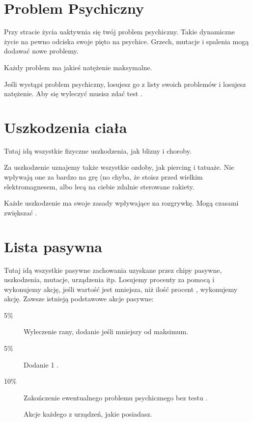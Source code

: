 \section{Problem Psychiczny}
Przy stracie życia uaktywnia się twój problem psychiczny.
Takie dynamiczne życie na pewno odciska swoje pięto na psychice. 
Grzech, mutacje i spalenia mogą dodawać nowe problemy.

Każdy problem ma jakieś natężenie maksymalne.

Jeśli wystąpi problem psychiczny, losujesz go z listy swoich problemów i losujesz natężenie.
Aby się wyleczyć musisz zdać test \abh{}.

\section{Uszkodzenia ciała}
Tutaj idą wszystkie fizyczne uszkodzenia, jak blizny i choroby.

Za uszkodzenie uznajemy także wszystkie ozdoby, jak piercing i tatuaże.
Nie wpływają one za bardzo na grę (no chyba, że stoisz przed wielkim elektromagnesem, albo lecą na ciebie zdalnie sterowane rakiety.

Każde uszkodzenie ma swoje zasady wpływające na rozgrywkę.
Mogą czasami zwiększać \abnkp{}.

\section{Lista pasywna}
Tutaj idą wszystkie pasywne zachowania uzyskane przez chipy pasywne, uszkodzenia, mutacje, urządzenia itp.
Losujemy procenty za pomocą \dc{} i wykonujemy akcję, jeśli wartość jest mniejsza, niż ilość procent , wykonujemy akcję.
Zawsze istnieją podstawowe akcje pasywne:
\begin{description}
\item[5\%] Wyleczenie rany, dodanie \abzyc{} jeśli mniejszy od maksimum.
\item[5\%] Dodanie 1 \abkar{}.
\item[10\%] Zakończenie ewentualnego problemu psychicznego bez testu \abh{}.
\item[] Akcje każdego z urządzeń, jakie posiadasz.
\end{description}





